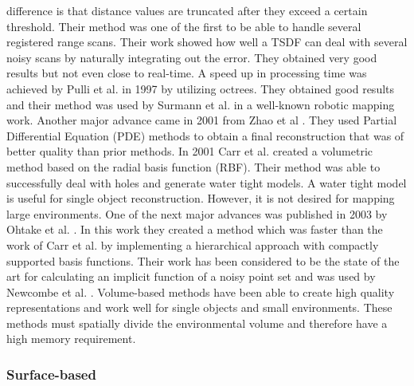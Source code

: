 difference is that distance values are truncated after they exceed a
certain threshold. Their method was one of the first to be able to handle
several registered range scans.  Their work showed how well a TSDF can deal
with several noisy scans by naturally integrating out the error. They
obtained very good results but not even close to real-time. A speed up in
processing time was achieved by Pulli et al. in 1997 \cite{Pulli1997} by
utilizing octrees. They obtained good results and their method was used by
Surmann et al. \cite{Surmann2003} in a well-known robotic mapping work.
Another major advance came in 2001 from Zhao et al \cite{Zhao2001}. They
used Partial Differential Equation (PDE) methods to obtain a final
reconstruction that was of better quality than prior methods. In 2001 Carr
et al. \cite{Carr2001} created a volumetric method based on the radial
basis function (RBF). Their method was able to successfully deal with holes
and generate water tight models. A water tight model is useful for single
object reconstruction. However, it is not desired for mapping large
environments. One of the next major advances was published in 2003 by
Ohtake et al. \cite{Ohtake2003}. In this work they created a method which
was faster than the work of Carr et al.  \cite{Carr2001} by implementing a
hierarchical approach with compactly supported basis functions. Their work
has been considered to be the state of the art for calculating an implicit
function of a noisy point set and was used by Newcombe et al.
\cite{Newcombe2010}. Volume-based methods have been able to create high
quality representations and work well for single objects and small
environments. These methods must spatially divide the environmental volume
and therefore have a high memory requirement.

\subsubsection{Surface-based}

